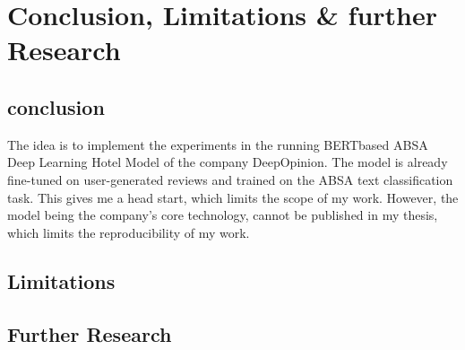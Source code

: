 
\section{Conclusion, Limitations \& further Research}

\subsection{conclusion}

The idea is to implement the experiments in the running BERTbased ABSA Deep Learning Hotel Model of the company DeepOpinion. The model is already fine-tuned on user-generated reviews and trained on the ABSA text classification task. This gives me a head start, which limits the scope of my work. However, the model being the company's core technology, cannot be published in my thesis, which limits the reproducibility of my work.


\subsection{Limitations}


\subsection{Further Research}





\FloatBarrier


